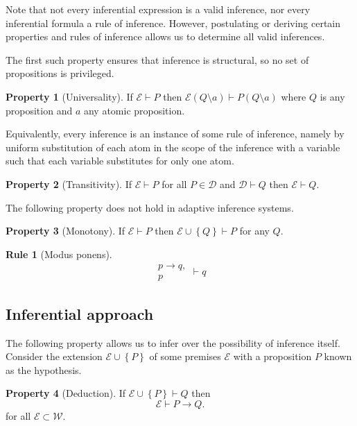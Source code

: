 \documentclass{amsbook}
\newcommand{\setsm}[1]{\left\{#1\right\}}
\newcommand{\wffs}{\mathcal W}
\newcommand{\infers}{\mathrel\vdash}
\newcommand{\then}{\mathrel\rightarrow}
\theoremstyle{definition}
\newtheorem{prop}{Property}[section]
\newtheorem{subprop}[prop]{Property}
\newtheorem{frule}{Rule}[chapter]
\begin{document}
Note that not every inferential expression is a valid inference, nor every inferential formula a rule of inference. However, postulating or deriving certain properties and rules of inference allows us to determine all valid inferences.

The first such property ensures that inference is structural, so no set of propositions is privileged.

\begin{prop}[Universality]
    If $\mathcal E \infers P$ then $\mathcal E(Q \setminus a) \infers P(Q \setminus a)$ where $Q$ is any proposition and $a$ any atomic proposition.
\end{prop}

Equivalently, every inference is an instance of some rule of inference, namely by uniform substitution of each atom in the scope of the inference with a variable such that each variable substitutes for only one atom.

\begin{prop}[Transitivity]
    If $\mathcal E \infers P$ for all $P \in \mathcal D$ and $\mathcal D \infers Q$ then $\mathcal E \infers Q$.
\end{prop}

The following property does not hold in adaptive inference systems.

\begin{prop}[Monotony]
    If $\mathcal E \infers P$ then $\mathcal E \cup \setsm Q \infers P$ for any $Q$.
\end{prop}

\begin{frule}[Modus ponens]
    $$\begin{aligned}p \rightarrow q, \\ p\end{aligned} \infers q$$
\end{frule}

\subsection{Inferential approach}

The following property allows us to infer over the possibility of inference itself. Consider the extension $\mathcal E \cup\setsm P$ of some premises $\mathcal E$ with a proposition $P$ known as the hypothesis.

\begin{subprop}[Deduction]
    If $\mathcal E \cup\setsm P \infers Q$ then
    $$\mathcal E \infers P \then Q.$$
    for all $\mathcal E \subset \wffs$.
\end{subprop}
\end{document}
